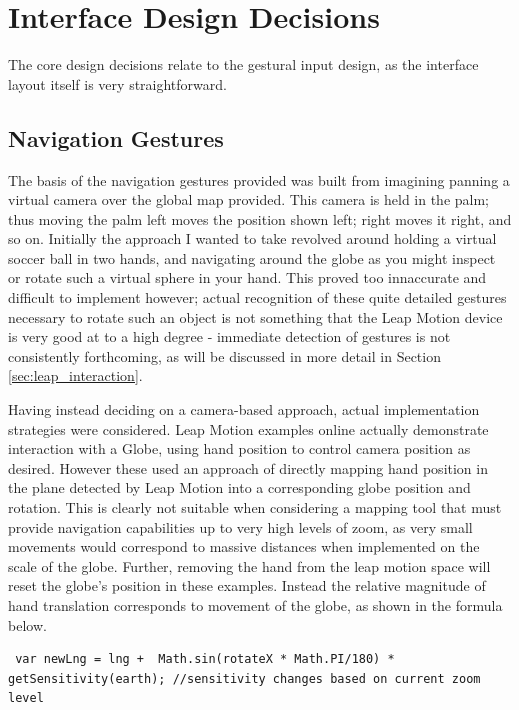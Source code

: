 \documentclass{sigplanconf}
\renewcommand{\lstlistingname}{Listing}%
\begin{document}
\section{Interface Design Decisions}
\label{sec:design_decisions}

The core design decisions relate to the gestural input design, as the interface layout itself is very straightforward. 

\subsection{Navigation Gestures}

The basis of the navigation gestures provided was built from imagining panning a virtual camera over the global map provided. This camera is held in the palm; thus moving the palm left moves the position shown left; right moves it right, and so on. Initially the approach I wanted to take revolved around holding a virtual soccer ball in two hands, and navigating around the globe as you might inspect or rotate such a virtual sphere in your hand. This proved too innaccurate and difficult to implement however; actual recognition of these quite detailed gestures necessary to rotate such an object is not something that the Leap Motion device is very good at to a high degree - immediate detection of gestures is not consistently forthcoming, as will be discussed in more detail in Section \ref{sec:leap_interaction}.

Having instead deciding on a camera-based approach, actual implementation strategies were considered. Leap Motion examples online actually demonstrate interaction with a Globe, using hand position to control camera position as desired. However these used an approach of directly mapping hand position in the plane detected by Leap Motion into a corresponding globe position and rotation. This is clearly not suitable when considering a mapping tool that must provide navigation capabilities up to very high levels of zoom, as very small movements would correspond to massive distances when implemented on the scale of the globe. Further, removing the hand from the leap motion space will reset the globe's position in these examples. Instead the relative magnitude of hand translation corresponds to movement of the globe, as shown in the formula below.

\begin{lstlisting}
 var newLng = lng +  Math.sin(rotateX * Math.PI/180) * getSensitivity(earth); //sensitivity changes based on current zoom level
\end{lstlisting}
\end{document}
